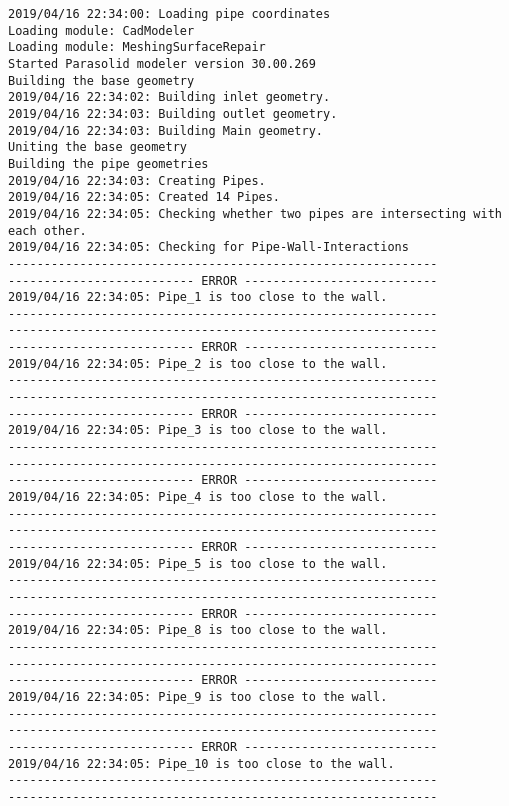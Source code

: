 \documentclass{article}
\begin{document}
{\tiny 
\begin{verbatim}
2019/04/16 22:34:00: Loading pipe coordinates
Loading module: CadModeler
Loading module: MeshingSurfaceRepair
Started Parasolid modeler version 30.00.269
Building the base geometry
2019/04/16 22:34:02: Building inlet geometry.
2019/04/16 22:34:03: Building outlet geometry.
2019/04/16 22:34:03: Building Main geometry.
Uniting the base geometry
Building the pipe geometries
2019/04/16 22:34:03: Creating Pipes.
2019/04/16 22:34:05: Created 14 Pipes.
2019/04/16 22:34:05: Checking whether two pipes are intersecting with each other.
2019/04/16 22:34:05: Checking for Pipe-Wall-Interactions
------------------------------------------------------------
-------------------------- ERROR ---------------------------
2019/04/16 22:34:05: Pipe_1 is too close to the wall.
------------------------------------------------------------
------------------------------------------------------------
-------------------------- ERROR ---------------------------
2019/04/16 22:34:05: Pipe_2 is too close to the wall.
------------------------------------------------------------
------------------------------------------------------------
-------------------------- ERROR ---------------------------
2019/04/16 22:34:05: Pipe_3 is too close to the wall.
------------------------------------------------------------
------------------------------------------------------------
-------------------------- ERROR ---------------------------
2019/04/16 22:34:05: Pipe_4 is too close to the wall.
------------------------------------------------------------
------------------------------------------------------------
-------------------------- ERROR ---------------------------
2019/04/16 22:34:05: Pipe_5 is too close to the wall.
------------------------------------------------------------
------------------------------------------------------------
-------------------------- ERROR ---------------------------
2019/04/16 22:34:05: Pipe_8 is too close to the wall.
------------------------------------------------------------
------------------------------------------------------------
-------------------------- ERROR ---------------------------
2019/04/16 22:34:05: Pipe_9 is too close to the wall.
------------------------------------------------------------
------------------------------------------------------------
-------------------------- ERROR ---------------------------
2019/04/16 22:34:05: Pipe_10 is too close to the wall.
------------------------------------------------------------
------------------------------------------------------------

\end{verbatim}}
\end{document}
